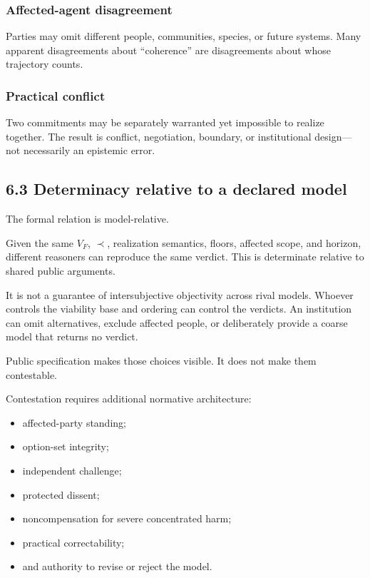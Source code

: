 \documentclass[
  11pt,
]{article}
\providecommand{\tightlist}{%
  \setlength{\itemsep}{0pt}\setlength{\parskip}{0pt}}
\begin{document}
\subsubsection{Affected-agent
disagreement}\label{affected-agent-disagreement}

Parties may omit different people, communities, species, or future
systems. Many apparent disagreements about ``coherence'' are
disagreements about whose trajectory counts.

\subsubsection{Practical conflict}\label{practical-conflict}

Two commitments may be separately warranted yet impossible to realize
together. The result is conflict, negotiation, boundary, or
institutional design---not necessarily an epistemic error.

\subsection{6.3 Determinacy relative to a declared
model}\label{determinacy-relative-to-a-declared-model}

The formal relation is model-relative.

Given the same \(V_F\), \(\prec\), realization semantics, floors,
affected scope, and horizon, different reasoners can reproduce the same
verdict. This is determinate relative to shared public arguments.

It is not a guarantee of intersubjective objectivity across rival
models. Whoever controls the viability base and ordering can control the
verdicts. An institution can omit alternatives, exclude affected people,
or deliberately provide a coarse model that returns no verdict.

Public specification makes those choices visible. It does not make them
contestable.

Contestation requires additional normative architecture:

\begin{itemize}
\tightlist
\item
  affected-party standing;
\item
  option-set integrity;
\item
  independent challenge;
\item
  protected dissent;
\item
  noncompensation for severe concentrated harm;
\item
  practical correctability;
\item
  and authority to revise or reject the model.
\end{itemize}
\end{document}
